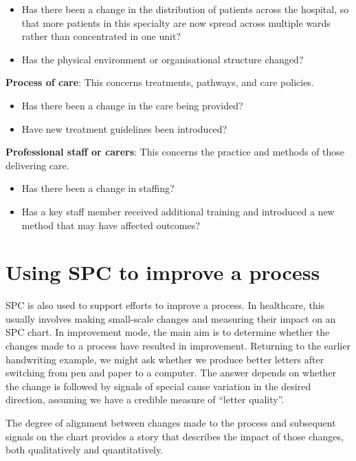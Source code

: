 \documentclass[
]{book}
\providecommand{\tightlist}{%
  \setlength{\itemsep}{0pt}\setlength{\parskip}{0pt}}
\begin{document}
\begin{itemize}
\tightlist
\item
  Has there been a change in the distribution of patients across the
  hospital, so that more patients in this specialty are now spread
  across multiple wards rather than concentrated in one unit?
\item
  Has the physical environment or organisational structure changed?
\end{itemize}

\textbf{Process of care}: This concerns treatments, pathways, and care
policies.

\begin{itemize}
\tightlist
\item
  Has there been a change in the care being provided?
\item
  Have new treatment guidelines been introduced?
\end{itemize}

\textbf{Professional staff or carers}: This concerns the practice and
methods of those delivering care.

\begin{itemize}
\tightlist
\item
  Has there been a change in staffing?
\item
  Has a key staff member received additional training and introduced a
  new method that may have affected outcomes?
\end{itemize}

\section{Using SPC to improve a
process}\label{using-spc-to-improve-a-process}

SPC is also used to support efforts to improve a process. In healthcare,
this usually involves making small-scale changes and measuring their
impact on an SPC chart. In improvement mode, the main aim is to
determine whether the changes made to a process have resulted in
improvement. Returning to the earlier handwriting example, we might ask
whether we produce better letters after switching from pen and paper to
a computer. The answer depends on whether the change is followed by
signals of special cause variation in the desired direction, assuming we
have a credible measure of ``letter quality''.

The degree of alignment between changes made to the process and
subsequent signals on the chart provides a story that describes the
impact of those changes, both qualitatively and quantitatively.
\end{document}

